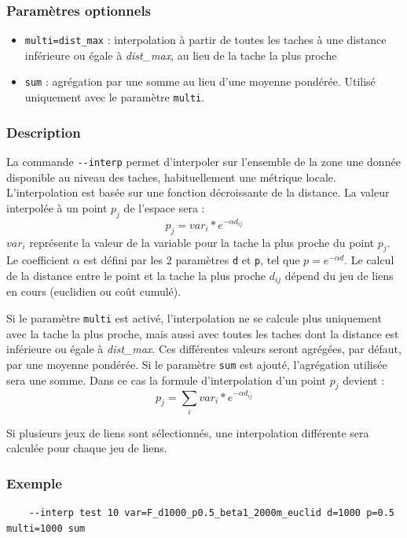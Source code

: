 \documentclass[a4paper,10pt]{report}
\begin{document}
\subsubsection{Paramètres optionnels}
\begin{itemize}
	\item \verb|multi=dist_max| : interpolation à partir de toutes les taches à une distance inférieure ou égale à \textit{dist\_max}, au lieu de la tache la plus proche
	\item \verb|sum| : agrégation par une somme au lieu d'une moyenne pondérée. Utilisé uniquement avec le paramètre \verb|multi|.
\end{itemize}

\subsubsection{Description}
La commande \verb|--interp| permet d'interpoler sur l'ensemble de la zone une donnée disponible au niveau des taches, habituellement une métrique locale.
L'interpolation est basée sur une fonction décroissante de la distance. La valeur interpolée à un point $p_j$ de l'espace sera :
$$p_j = var_i * e^{-\alpha d_{ij}} $$
$var_i$ représente la valeur de la variable pour la tache la plus proche du point $p_j$. Le coefficient $\alpha$ est défini par les 2 paramètres \verb|d| et \verb|p|, tel que $p={e}^{-\alpha d}$.
Le calcul de la distance entre le point et la tache la plus proche $d_{ij}$ dépend du jeu de liens en cours (euclidien ou coût cumulé).

Si le paramètre \verb|multi| est activé, l'interpolation ne se calcule plus uniquement avec la tache la plus proche, mais aussi avec toutes les taches dont la distance est inférieure ou égale à \textit{dist\_max}. Ces différentes valeurs seront agrégées, par défaut, par une moyenne pondérée. Si le paramètre \verb|sum| est ajouté, l'agrégation utilisée sera une somme. Dans ce cas la formule d'interpolation d'un point $p_j$ devient :
$$p_j = \sum_i{var_i * e^{-\alpha d_{ij}}} $$

Si plusieurs jeux de liens sont sélectionnés, une interpolation différente sera calculée pour chaque jeu de liens. 

\subsubsection{Exemple}
\begin{Verbatim}
	--interp test 10 var=F_d1000_p0.5_beta1_2000m_euclid d=1000 p=0.5 multi=1000 sum
\end{Verbatim}
\end{document}
